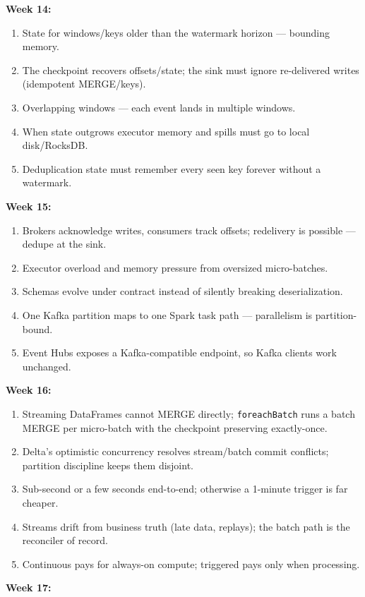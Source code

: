 \documentclass[11pt, a4paper]{article}
\begin{document}
\noindent\textbf{Week 14:}
\begin{enumerate}[itemsep=0pt, leftmargin=2em]
    \item State for windows/keys older than the watermark horizon --- bounding memory.
    \item The checkpoint recovers offsets/state; the sink must ignore re-delivered writes (idempotent MERGE/keys).
    \item Overlapping windows --- each event lands in multiple windows.
    \item When state outgrows executor memory and spills must go to local disk/RocksDB.
    \item Deduplication state must remember every seen key forever without a watermark.
\end{enumerate}
\noindent\textbf{Week 15:}
\begin{enumerate}[itemsep=0pt, leftmargin=2em]
    \item Brokers acknowledge writes, consumers track offsets; redelivery is possible --- dedupe at the sink.
    \item Executor overload and memory pressure from oversized micro-batches.
    \item Schemas evolve under contract instead of silently breaking deserialization.
    \item One Kafka partition maps to one Spark task path --- parallelism is partition-bound.
    \item Event Hubs exposes a Kafka-compatible endpoint, so Kafka clients work unchanged.
\end{enumerate}
\noindent\textbf{Week 16:}
\begin{enumerate}[itemsep=0pt, leftmargin=2em]
    \item Streaming DataFrames cannot MERGE directly; \texttt{foreachBatch} runs a batch MERGE per micro-batch with the checkpoint preserving exactly-once.
    \item Delta's optimistic concurrency resolves stream/batch commit conflicts; partition discipline keeps them disjoint.
    \item Sub-second or a few seconds end-to-end; otherwise a 1-minute trigger is far cheaper.
    \item Streams drift from business truth (late data, replays); the batch path is the reconciler of record.
    \item Continuous pays for always-on compute; triggered pays only when processing.
\end{enumerate}
\noindent\textbf{Week 17:}
\end{document}
